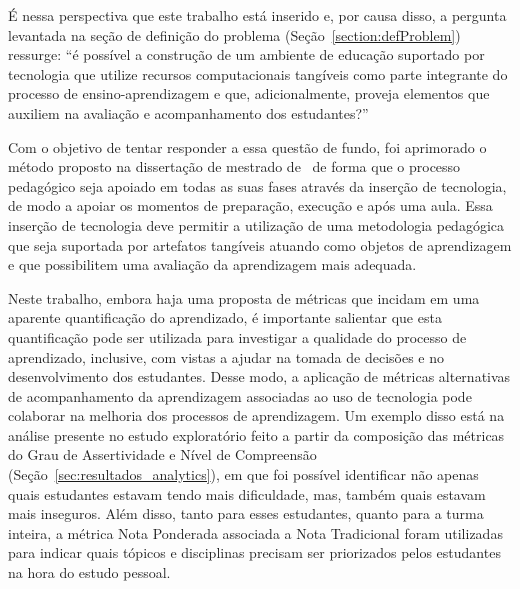 
É nessa perspectiva que este trabalho está inserido e, por causa disso, a pergunta levantada na seção de definição do problema (Seção~\ref{section:defProblem}) ressurge: ``é possível a construção de um ambiente de educação suportado por tecnologia que utilize recursos computacionais tangíveis como parte integrante do processo de ensino-aprendizagem e que, adicionalmente, proveja elementos que auxiliem na avaliação e acompanhamento dos estudantes?''

Com o objetivo de tentar responder a essa questão de fundo, foi aprimorado o método proposto na dissertação de mestrado de~\cite{Leitao:2014} de forma 
que o processo pedagógico seja apoiado em todas as suas fases através da inserção de tecnologia, de modo a apoiar os momentos de preparação, execução e após uma aula. Essa inserção de tecnologia 
deve permitir a utilização de uma metodologia pedagógica que seja suportada por artefatos tangíveis atuando como objetos de aprendizagem e que possibilitem uma avaliação da aprendizagem mais adequada.

Neste trabalho, embora haja uma proposta de métricas que incidam em uma aparente quantificação do aprendizado, é importante salientar que esta quantificação pode ser utilizada para investigar a qualidade do processo de aprendizado, inclusive, com vistas a ajudar na tomada de decisões e no desenvolvimento dos estudantes. Desse modo, a aplicação de métricas alternativas de acompanhamento da aprendizagem associadas ao uso de tecnologia pode colaborar na melhoria dos processos de aprendizagem. Um exemplo disso está na análise presente no estudo exploratório feito a partir da composição das métricas do Grau de Assertividade e Nível de Compreensão (Seção~\ref{sec:resultados_analytics}), em que foi possível identificar não apenas quais estudantes estavam tendo mais dificuldade, mas, também quais estavam mais inseguros. Além disso, tanto para esses estudantes, quanto para a turma inteira, a métrica Nota Ponderada associada a Nota Tradicional foram utilizadas para indicar quais tópicos e disciplinas precisam ser priorizados pelos estudantes na hora do estudo pessoal.

